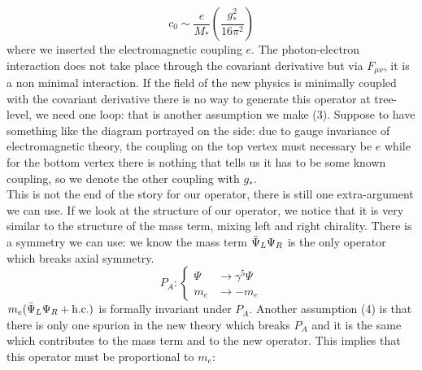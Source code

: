 \documentclass[../main.tex]{subfiles}
\begin{document}
\begin{example}
\[
c_0\sim\frac{e}{M_*}\left(\frac{g_*^2}{16\pi^2}\right)
\]
where we inserted the electromagnetic coupling $e$. The photon-electron interaction does not take place through the covariant derivative but via $F_{\mu\nu}$, it is a non minimal interaction. If the field of the new physics is minimally coupled with the covariant derivative there is no way to generate this operator at tree-level, we need one loop: that is another assumption we make (3). Suppose to have something like the diagram portrayed on the side: due to gauge invariance of electromagnetic theory, the coupling on the top vertex must necessary be $e$ while for the bottom vertex there is nothing that tells us it has to be some known coupling, so we denote the other coupling with $g_*$.\\
This is not the end of the story for our operator, there is still one extra-argument we can use. If we look at the structure of our operator, we notice that it is very similar to the structure of the mass term, mixing left and right chirality. There is a symmetry we can use: we know the mass term $\Bar{\Psi}_L\Psi_R$ is the only operator which breaks axial symmetry.
\[
P_A:
\left\{
\begin{aligned}
\Psi&\to\gamma^5\Psi\\
m_e&\to-m_e
\end{aligned}
\right.
\]
$m_e(\Bar{\Psi}_L\Psi_R+\text{h.c.})$ is formally invariant under $P_A$. Another assumption (4) is that there is only one spurion in the new theory which breaks $P_A$ and it is the same which contributes to the mass term and to the new operator. This implies that this operator must be proportional to $m_e$:

\end{example}
\end{document}
